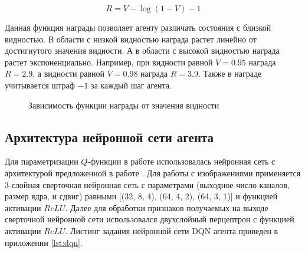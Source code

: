 \begin{equation}
    R = V - \log(1-V) - 1
\label{eq:dqn_reward}
\end{equation}

Данная функция награды позволяет агенту различать состояния с близкой видностью. В области с низкой видностью награда растет линейно от достигнутого значения видности. А в области с высокой видностью награда растет экспоненциально. Например, при видности равной $V = 0.95$ награда $R = 2.9$, а видности равной $V = 0.98$ награда $R = 3.9$. Также в награде учитывается штраф $-1$ за каждый шаг агента. 

\begin{figure}[ht]
\caption{Зависимость функции награды от значения видности}
\label{fig:reward_visib}
\end{figure}

\subsection{Архитектура нейронной сети агента}

Для параметризации $Q$-функции в работе использовалась нейронная сеть с архитектурой предложенной в работе \cite{mnih2013atari}. Для работы с изображениями применяется 3-слойная сверточная нейронная сеть с параметрами (выходное число каналов, размер ядра, и сдвиг) равными [(32, 8, 4), (64, 4, 2), (64, 3, 1)] и функцией активации $ReLU$. Далее для обработки признаков получаемых на выходе сверточной нейронной сети использовался двухслойный перцептрон с функцией активации $ReLU$. Листинг задания нейронной сети DQN агента приведен в приложении \ref{lst:dqn}. 

